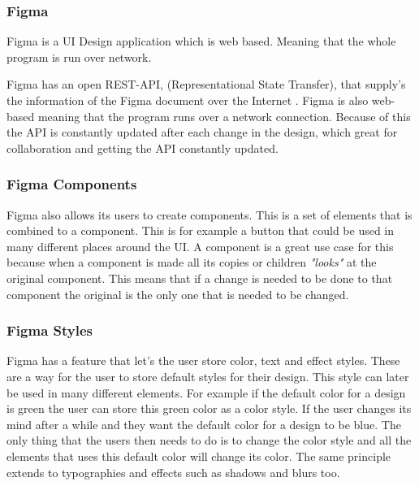  






\subsubsection{Figma}%
\label{sub:Figma}
Figma is a UI Design application which is web based. Meaning that the whole program is run over network. 

Figma has an open REST-API, (Representational State Transfer), that supply's the information of the Figma document over the Internet \cite{figmaFigma, RepresentationalStateTransfer2021}. Figma is also web-based meaning that the program runs over a network connection. Because of this the API is constantly updated after each change in the design, which great for collaboration and getting the API constantly updated.

\subsubsection{Figma Components}%
\label{ssub:Figma Components}

Figma also allows its users to create components. This is a set of elements that is combined to a component. This is for example a button that could be used in many different places around the UI. A component is a great use case for this because when a component is made all its copies or children \textit{"looks"} at the original component. This means that if a change is needed to be done to that component the original is the only one that is needed to be changed.

\subsubsection{Figma Styles}%
\label{ssub:Styles}
Figma has a feature that let's the user store color, text and effect styles. These are a way for the user to store default styles for their design. This style can later be used in many different elements. For example if the default color for a design is green the user can store this green color as a color style. If the user changes its mind after a while and they want the default color for a design to be blue. The only thing that the users then needs to do is to change the color style and all the elements that uses this default color will change its color. The same principle extends to typographies and effects such as shadows and blurs too. 




